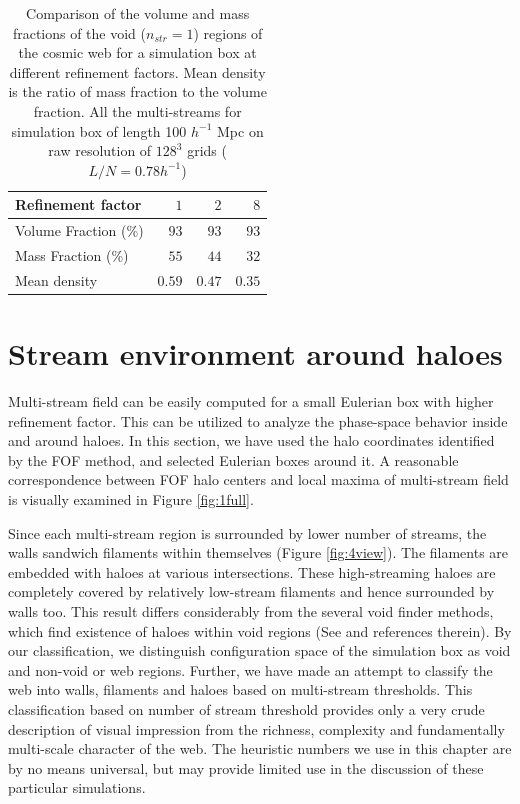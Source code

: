  \begin{table}
 \centering
  \caption{Comparison of the volume and mass fractions of the void ($n_{str} = 1$) regions of the cosmic web for a simulation box at different refinement factors. Mean density is the ratio of mass fraction to the volume fraction. All the multi-streams for simulation box of length 100 $h^{-1}$ Mpc on raw resolution of $128^{3}$ grids ($ L/N = 0.78 h^{-1}$) }
\begin{tabular}{|l|r|r|r|}
\hline
Refinement factor               & $1$ & $2$& $8$   \\ \hline
Volume Fraction (\%)                 & $93$   & $93$    & $93$       \\ \hline
Mass Fraction   (\%)               & $55$   & $44$   & $32$           \\ \hline
Mean density                    & $0.59$ & $0.47$    & $0.35$        \\ \hline
\end{tabular}

 \label{tab:Compare_ref}
\end{table}



\section{Stream environment around haloes}
\label{sec:local}

Multi-stream field can be easily computed for a small Eulerian box with higher refinement factor. This can be utilized to analyze the phase-space behavior inside and around haloes. In this section, 
we have used the halo coordinates identified by the FOF method, and selected Eulerian boxes around it. A reasonable  correspondence between FOF halo centers and local maxima of multi-stream field is visually examined in Figure \ref{fig:1full}. 

Since each multi-stream region is surrounded by lower number of streams, the walls sandwich filaments within themselves (Figure \ref{fig:4view}). The filaments are embedded with haloes at various intersections. These high-streaming haloes are completely covered by relatively low-stream filaments and hence surrounded by walls too. This result differs considerably from the several void finder methods, which find existence of haloes within  void regions (See \citealt{Colberg2008} and references therein). By our classification, we distinguish configuration space of the simulation box as void and non-void or web regions. Further, we have made an attempt to classify the web into walls, filaments and haloes based on multi-stream thresholds. This classification based on number of stream threshold provides only a very crude description of visual impression from the richness, complexity and fundamentally multi-scale character of the web. The heuristic numbers we use in this chapter are by no means universal, but may provide limited use in the discussion of these particular simulations.

